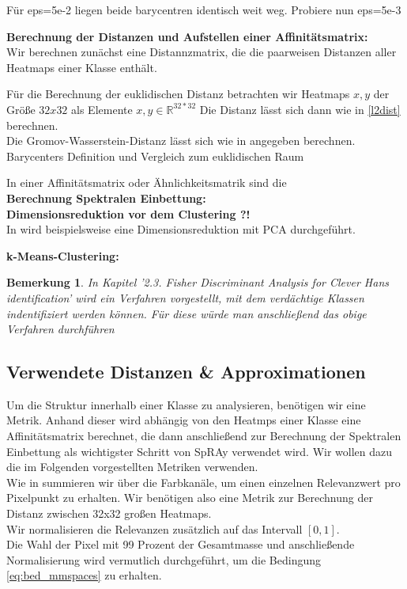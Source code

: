 \documentclass[11pt,a4paper]{article}
\newtheorem{remark}[theorem]{Bemerkung}
\numberwithin{equation}{section}
\begin{document}
	Für eps=5e-2 liegen beide barycentren identisch weit weg. Probiere nun eps=5e-3
	
	\noindent \textbf{Berechnung der Distanzen und Aufstellen einer Affinitätsmatrix:}\\
	
	Wir berechnen zunächst eine Distannzmatrix, die die paarweisen Distanzen aller Heatmaps einer Klasse enthält.	
	
	Für die Berechnung der euklidischen Distanz betrachten wir Heatmaps $x,y$ der Größe $32x32$ als Elemente $x,y \in \mathbb{R}^{32*32}$ Die Distanz lässt sich dann wie in \autoref{l2dist} berechnen.\\
	
	Die Gromov-Wasserstein-Distanz lässt sich wie in \cite{gwd_averaging_kernels} angegeben berechnen. \\
	
	Barycenters Definition und Vergleich zum euklidischen Raum \cite{bary_wasserstein_space}
	
	In einer Affinitätsmatrix oder Ähnlichkeitsmatrik sind die \\
	
	\noindent \textbf{Berechnung Spektralen Einbettung:}\\
	
	\noindent \textbf{Dimensionsreduktion vor dem Clustering ?!}\\
	
	In \cite{AC} wird beispielsweise eine Dimensionsreduktion mit PCA durchgeführt.
	
	\noindent \textbf{k-Means-Clustering:}\\
	\begin{remark}
		In \cite{imagenet_unhansed_v1} Kapitel '2.3. Fisher Discriminant Analysis for Clever Hans
		identification' wird ein Verfahren vorgestellt, mit dem verdächtige Klassen indentifiziert werden können. Für diese würde man anschließend das obige Verfahren durchführen
	\end{remark}
	\subsection{Verwendete Distanzen \& Approximationen}
	Um die Struktur innerhalb einer Klasse zu analysieren, benötigen wir eine Metrik.
	Anhand dieser wird abhängig von den Heatmps einer Klasse eine Affinitätsmatrix berechnet, die dann anschließend zur Berechnung der Spektralen Einbettung als wichtigster Schritt von SpRAy verwendet wird. Wir wollen dazu die im Folgenden vorgestellten Metriken verwenden.\\
	Wie in \cite{imagenet_unhansed_v1} summieren wir über die Farbkanäle, um einen einzelnen Relevanzwert pro Pixelpunkt zu erhalten. Wir benötigen also eine Metrik zur Berechnung der Distanz zwischen 32x32 großen Heatmaps.\\
	Wir normalisieren die Relevanzen zusätzlich auf das Intervall $[0,1]$.\\
	Die Wahl der Pixel mit 99 Prozent der Gesamtmasse und anschließende Normalisierung wird vermutlich durchgeführt, um die Bedingung \autoref{eq:bed_mmspaces} zu erhalten.
	
\end{document}
